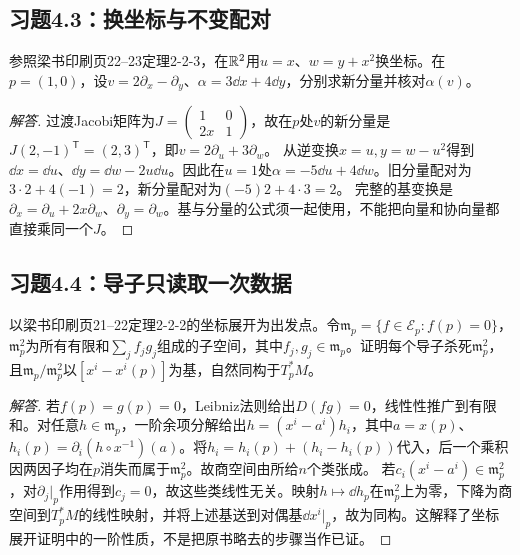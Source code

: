 \subsection*{习题4.3：换坐标与不变配对}
参照梁书印刷页22--23定理2-2-3，在$\mathbb{R}^2$用$u=x$、$w=y+x^2$换坐标。在$p=(1,0)$，设$v=2\partial_x-\partial_y$、$\alpha=3\dd x+4\dd y$，分别求新分量并核对$\alpha(v)$。
\begin{proof}[解答]
过渡Jacobi矩阵为$J=\left(\begin{smallmatrix}1&0\\2x&1\end{smallmatrix}\right)$，故在$p$处$v$的新分量是$J(2,-1)^{\mathsf T}=(2,3)^{\mathsf T}$，即$v=2\partial_u+3\partial_w$。
从逆变换$x=u,y=w-u^2$得到$\dd x=\dd u$、$\dd y=\dd w-2u\dd u$。因此在$u=1$处$\alpha=-5\dd u+4\dd w$。旧分量配对为$3\cdot2+4(-1)=2$，新分量配对为$(-5)2+4\cdot3=2$。
完整的基变换是$\partial_x=\partial_u+2x\partial_w$、$\partial_y=\partial_w$。基与分量的公式须一起使用，不能把向量和协向量都直接乘同一个$J$。
\end{proof}

\subsection*{习题4.4：导子只读取一次数据}
以梁书印刷页21--22定理2-2-2的坐标展开为出发点。令$\mathfrak m_p=\{f\in\mathcal E_p:f(p)=0\}$，$\mathfrak m_p^2$为所有有限和$\sum_j f_jg_j$组成的子空间，其中$f_j,g_j\in\mathfrak m_p$。证明每个导子杀死$\mathfrak m_p^2$，且$\mathfrak m_p/\mathfrak m_p^2$以$[x^i-x^i(p)]$为基，自然同构于$T_p^*M$。
\begin{proof}[解答]
若$f(p)=g(p)=0$，Leibniz法则给出$D(fg)=0$，线性性推广到有限和。对任意$h\in\mathfrak m_p$，一阶余项分解给出$h=(x^i-a^i)h_i$，其中$a=x(p)$、$h_i(p)=\partial_i(h\circ x^{-1})(a)$。将$h_i=h_i(p)+(h_i-h_i(p))$代入，后一个乘积因两因子均在$p$消失而属于$\mathfrak m_p^2$。故商空间由所给$n$个类张成。
若$c_i(x^i-a^i)\in\mathfrak m_p^2$，对$\partial_j|_p$作用得到$c_j=0$，故这些类线性无关。映射$h\mapsto\dd h_p$在$\mathfrak m_p^2$上为零，下降为商空间到$T_p^*M$的线性映射，并将上述基送到对偶基$\dd x^i|_p$，故为同构。这解释了坐标展开证明中的一阶性质，不是把原书略去的步骤当作已证。
\end{proof}

